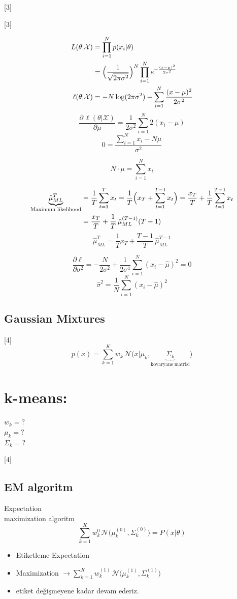 \documentclass[11pt,a4paper]{article}
\begin{document}
[3]

[3]

\begin{align*}
L(\theta|\mathcal{X}) &= \prod_{i=1}^{N} p(x_i|\theta) \\
&= \Bigl(\frac{1}{\sqrt{2\pi\sigma^2}}\Bigr)^{N}\prod_{i=1}^{N} e^{-\frac{(x-\mu)^2}{2\sigma^2}} \\
\ell(\theta|\mathcal{X}) &= -N\log(2\pi\sigma^2) - \sum_{i=1}^{N}\frac{(x-\mu)^2}{2\sigma^2}
\end{align*}
\[ \frac{\partial\,\ell(\theta|\mathcal{X})}{\partial\mu} = \frac{1}{2\sigma^2}\sum_{i=1}^{N} 2(x_i-\mu) \]
\[ 0 = \frac{\sum_{i=1}^{N} x_i - N\mu}{\sigma^2} \]

\[ N\cdot\mu = \sum_{i=1}^{N} x_i \]

\begin{align*}
\underbrace{\hat\mu_{ML}^{T}}_{\text{Maximum likelihood}} &= \frac{1}{T}\sum_{t=1}^{T} x_t = \frac{1}{T}\Bigl(x_T + \sum_{t=1}^{T-1} x_t\Bigr) = \frac{x_T}{T} + \frac{1}{T}\sum_{t=1}^{T-1} x_t \\
&= \frac{x_T}{T} + \frac{1}{T}\,\hat\mu_{ML}^{(T-1)}(T-1)
\end{align*}
\[ \hat\mu_{ML}^{T} = \frac{1}{T}x_T + \frac{T-1}{T}\,\hat\mu_{ML}^{T-1} \]

\[ \frac{\partial \ell}{\partial\sigma^2} = -\frac{N}{2\sigma^2} + \frac{1}{2\sigma^4}\sum_{i=1}^{N}(x_i-\hat\mu)^2 = 0 \]
\[ \hat\sigma^2 = \frac{1}{N}\sum_{i=1}^{N}(x_i-\hat\mu)^2 \]

\subsection{Gaussian Mixtures}
[4]
\[ p(x) = \sum_{k=1}^{K} w_k\,\mathcal{N}\bigl(x|\mu_k, \underbrace{\Sigma_k}_{\text{kovaryans matrisi}}\bigr) \]

\section{k-means:}
\textcolor{kirmizikalem}{$w_k=?$ \\ $\mu_k=?$ \\ $\Sigma_k=?$}

[4]

\subsection{EM algoritm}
Expectation \\
maximization algoritm
\[ \sum_{k=1}^{K} w_k^{0}\,\mathcal{N}\bigl(\mu_k^{(0)},\Sigma_k^{(0)}\bigr) = P(x|\theta) \]
\begin{itemize}[label=$\hookrightarrow$]
\item Etiketleme Expectation
\item Maximization $\rightarrow \displaystyle\sum_{k=1}^{K} w_k^{(1)}\,\mathcal{N}\bigl(\mu_k^{(1)},\Sigma_k^{(1)}\bigr)$
\item etiket değişmeyene kadar devam ederiz.
\end{itemize}
\end{document}
